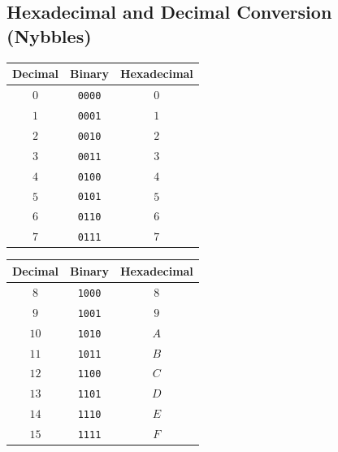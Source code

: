 \documentclass[12pt]{article}
\begin{document}
\newpage
\subsection{Hexadecimal and Decimal Conversion (Nybbles)}
\begin{table}[h]
\centering
\begin{minipage}[t]{0.48\textwidth}
\centering
\begin{tabular}{ccc}
\index{decimal}Decimal & \index{binary}Binary & \index{hexadecimal}Hexadecimal\\
\hline
$0$ & \texttt{0000} & $0$\\
$1$ & \texttt{0001} & $1$\\
$2$ & \texttt{0010} & $2$\\
$3$ & \texttt{0011} & $3$\\
$4$ & \texttt{0100} & $4$\\
$5$ & \texttt{0101} & $5$\\
$6$ & \texttt{0110} & $6$\\
$7$ & \texttt{0111} & $7$\\
\end{tabular}
\end{minipage}%
\hfill
\begin{minipage}[t]{0.48\textwidth}
\centering
\begin{tabular}{ccc}
\index{decimal}Decimal & \index{binary}Binary & \index{hexadecimal}Hexadecimal\\
\hline
$8$ & \texttt{1000} & $8$\\
$9$ & \texttt{1001} & $9$\\
$10$ & \texttt{1010} & $A$\\
$11$ & \texttt{1011} & $B$\\
$12$ & \texttt{1100} & $C$\\
$13$ & \texttt{1101} & $D$\\
$14$ & \texttt{1110} & $E$\\
$15$ & \texttt{1111} & $F$\\
\end{tabular}
\end{minipage}
\end{table}

\end{document}
